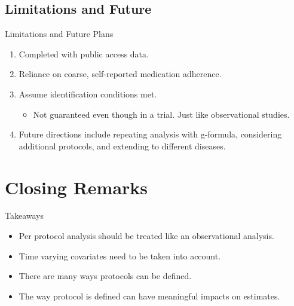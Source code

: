 \documentclass{beamer}
\begin{document}
 
 \subsection{Limitations and Future}
    
    \begin{frame}{Limitations and Future Plans}

    \begin{enumerate}
        \item Completed with public access data.\footnotemark[1]
        \item Reliance on coarse, self-reported medication adherence.
        \item Assume identification conditions met.
            \begin{itemize}
                \item[\ding{43}] Not guaranteed even though in a trial. Just like observational studies.
            \end{itemize} 
        \item Future directions include repeating analysis with g-formula, considering additional protocols, and extending to different diseases. 
    \end{enumerate}
    \end{frame}

 \section{Closing Remarks}
\begin{frame}{Takeaways}
\begin{itemize}
\item Per protocol analysis should be treated like an observational analysis.
\item Time varying covariates need to be taken into account.
\item There are many ways protocols can be defined.
\item The way protocol is defined can have meaningful impacts on estimates.
\end{itemize}

\end{frame}
\end{document}
